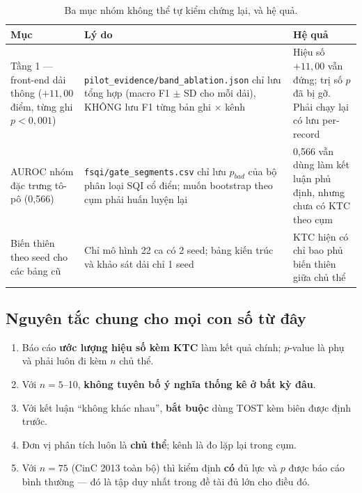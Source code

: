 \begin{table}[H]\centering\small
\caption{Ba mục nhóm không thể tự kiểm chứng lại, và hệ quả.}
\label{tab:stat_khong}
\begin{tabular}{@{}L{4.0cm} L{5.4cm} L{5.0cm}@{}}
\toprule
\textbf{Mục} & \textbf{Lý do} & \textbf{Hệ quả} \\
\midrule
Tầng 1 --- front-end dải thông ($+11{,}00$ điểm, từng ghi $p < 0{,}001$) &
\texttt{pilot\_evidence/band\_ablation.json} chỉ lưu tổng hợp (macro F1 $\pm$ SD cho mỗi dải), KHÔNG lưu
F1 từng bản ghi $\times$ kênh &
 Hiệu số $+11{,}00$ vẫn đứng; trị số $p$ đã bị
gỡ. Phải chạy lại có lưu per-record \\
AUROC nhóm đặc trưng tô-pô (0,566) & \texttt{fsqi/gate\_segments.csv} chỉ lưu $p_{bad}$ của bộ phân loại
SQI cổ điển; muốn bootstrap theo cụm phải huấn luyện lại &
0,566 vẫn dùng làm kết luận phủ định, nhưng chưa có KTC theo cụm \\
Biến thiên theo seed cho các bảng cũ & Chỉ mô hình 22 ca có 2 seed; bảng kiến trúc và khảo sát dải chỉ
1 seed & KTC hiện có chỉ bao phủ biến thiên giữa chủ thể \\
\bottomrule
\end{tabular}
\end{table}

\subsection{Nguyên tắc chung cho mọi con số từ đây}

\begin{enumerate}[leftmargin=1.6em,itemsep=3pt]
\item Báo cáo \textbf{ước lượng hiệu số kèm KTC} làm kết quả chính; $p$-value là phụ và phải luôn đi kèm
$n$ chủ thể.
\item Với $n = 5$--10, \textbf{không tuyên bố ý nghĩa thống kê ở bất kỳ đâu}.
\item Với kết luận ``không khác nhau'', \textbf{bắt buộc} dùng TOST kèm biên được định trước.
\item Đơn vị phân tích luôn là \textbf{chủ thể}; kênh là đo lặp lại trong cụm.
\item Với $n = 75$ (CinC 2013 toàn bộ) thì kiểm định \textbf{có} đủ lực và $p$ được báo cáo bình thường
--- đó là tập duy nhất trong đề tài đủ lớn cho điều đó.
\end{enumerate}
